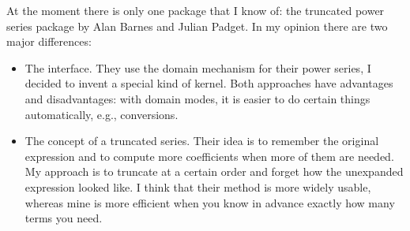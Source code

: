 At the moment there is only one \REDUCE{} package that I know of:
the truncated power series package by Alan Barnes and Julian Padget.
In my opinion there are two major differences:
\begin{itemize}
  \item The interface. They use the domain mechanism for their power
        series, I decided to invent a special kind of kernel. Both
        approaches have advantages and disadvantages: with domain
        modes, it is easier
        to do certain things automatically, e.g., conversions.
  \item The concept of a truncated series. Their idea is to remember
        the original expression and to compute more coefficients when
        more of them are needed. My approach is to truncate at a
        certain order and forget how the unexpanded expression
        looked like.  I think that their method is more widely
        usable, whereas mine is more efficient when you know in
        advance exactly how many terms you need.
\end{itemize}


